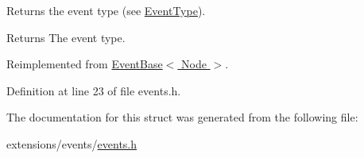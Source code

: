 Returns the event type (see \hyperlink{event__base_8h_a2628ea8d12e8b2563c32f05dc7fff6fa}{Event\+Type}). 

\begin{DoxyReturn}{Returns}
The event type. 
\end{DoxyReturn}


Reimplemented from \hyperlink{structEventBase_ae96f3766933526249a42e5eebd40d51f}{Event\+Base$<$ Node $>$}.



Definition at line 23 of file events.\+h.



The documentation for this struct was generated from the following file\+:\begin{DoxyCompactItemize}
\item 
extensions/events/\hyperlink{events_8h}{events.\+h}\end{DoxyCompactItemize}
